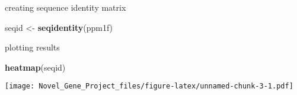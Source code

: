 \documentclass[]{article}
\newenvironment{Shaded}{\begin{snugshade}}{\end{snugshade}}
\newcommand{\KeywordTok}[1]{\textcolor[rgb]{0.13,0.29,0.53}{\textbf{#1}}}
\newcommand{\StringTok}[1]{\textcolor[rgb]{0.31,0.60,0.02}{#1}}
\newcommand{\NormalTok}[1]{#1}
\begin{document}
creating sequence identity matrix

\begin{Shaded}
\begin{Highlighting}[]
\NormalTok{seqid <-}\StringTok{ }\KeywordTok{seqidentity}\NormalTok{(ppm1f)}
\end{Highlighting}
\end{Shaded}

plotting results

\begin{Shaded}
\begin{Highlighting}[]
\KeywordTok{heatmap}\NormalTok{(seqid)}
\end{Highlighting}
\end{Shaded}

\texttt{[image: Novel\_Gene\_Project\_files/figure-latex/unnamed-chunk-3-1.pdf]}
\end{document}
